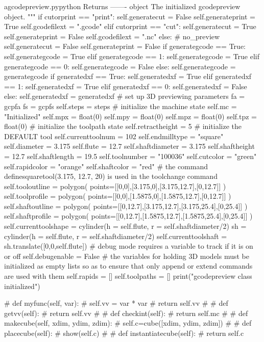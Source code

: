 \documentclass{ltxdoc}
\begin{document}
\begin{writecode}{a}{gcodepreview.py}{python}
        Returns
        -------
        object
            The initialized gcodepreview object.
        """
        if cutorprint == "print":
            self.generatecut = False
            self.generateprint = True
            self.gcodefilext = ".gcode"
        elif cutorprint == "cut":
            self.generatecut = True
            self.generateprint = False
            self.gcodefilext = ".nc"
        else: # no_preview
            self.generatecut = False
            self.generateprint = False
        if generategcode == True:
            self.generategcode = True
        elif generategcode == 1:
            self.generategcode = True
        elif generategcode == 0:
            self.generategcode = False
        else:
            self.generategcode = generategcode
        if generatedxf == True:
            self.generatedxf = True
        elif generatedxf == 1:
            self.generatedxf = True
        elif generatedxf == 0:
            self.generatedxf = False
        else:
            self.generatedxf = generatedxf
# set up 3D previewing parameters
        fa = gcpfa
        fs = gcpfs
        self.steps = steps
# initialize the machine state
        self.mc = "Initialized"
        self.mpx = float(0)
        self.mpy = float(0)
        self.mpz = float(0)
        self.tpz = float(0)
# initialize the toolpath state
        self.retractheight = 5
# initialize the DEFAULT tool
        self.currenttoolnum = 102
        self.endmilltype = "square"
        self.diameter = 3.175
        self.flute = 12.7
        self.shaftdiameter = 3.175
        self.shaftheight = 12.7
        self.shaftlength = 19.5
        self.toolnumber = "100036"
        self.cutcolor = "green"
        self.rapidcolor = "orange"
        self.shaftcolor = "red"
# the command definesquaretool(3.175, 12.7, 20) is used in the toolchange command
        self.tooloutline = polygon( points=[[0,0],[3.175,0],[3.175,12.7],[0,12.7]] )
        self.toolprofile = polygon( points=[[0,0],[1.5875,0],[1.5875,12.7],[0,12.7]] )
        self.shaftoutline = polygon( points=[[0,12.7],[3.175,12.7],[3.175,25.4],[0,25.4]] )
        self.shaftprofile = polygon( points=[[0,12.7],[1.5875,12.7],[1.5875,25.4],[0,25.4]] )
        self.currenttoolshape = cylinder(h = self.flute, r = self.shaftdiameter/2)
        sh = cylinder(h = self.flute, r = self.shaftdiameter/2)
        self.currenttoolshaft = sh.translate([0,0,self.flute])
# debug mode requires a variable to track if it is on or off
        self.debugenable = False
# the variables for holding 3D models must be initialized as empty lists so as to ensure that only append or extend commands are used with them
        self.rapids = []
        self.toolpaths = []
        print("gcodepreview class initialized")

#    def myfunc(self, var):
#        self.vv = var * var
#        return self.vv
#
#    def getvv(self):
#        return self.vv
#        
#    def checkint(self):
#        return self.mc
#
#    def makecube(self, xdim, ydim, zdim):
#        self.c=cube([xdim, ydim, zdim])
#        
#    def placecube(self):
#        show(self.c)
#
#    def instantiatecube(self):
#        return self.c

\end{writecode}
\addtocounter{gcpy}{112}
\end{document}
